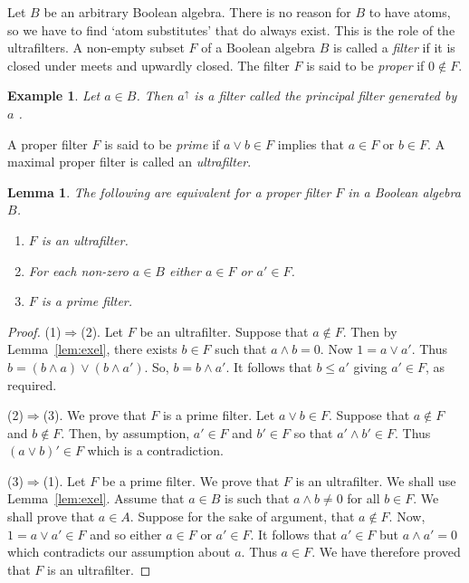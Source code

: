 \documentclass[a4paper]{amsart}
\newtheorem{lemma}[theorem]{Lemma}
\newtheorem{example}[theorem]{Example}
\begin{document}
Let $B$ be an arbitrary Boolean algebra.
There is no reason for $B$ to have atoms, so we have to find `atom substitutes' that do always exist.
This is the role of the ultrafilters.
A non-empty subset $F$ of a Boolean algebra $B$ is called a {\em filter} if it is closed under meets and upwardly closed.
The filter $F$ is said to be {\em proper} if $0 \notin F$.

\begin{example}\label{ex:needed}
{\em Let $a \in B$.
Then $a^{\uparrow}$ is a filter called the {\em principal filter generated by $a$}
}.
\end{example}




A proper filter $F$ is said to be {\em prime} if $a \vee b \in F$ implies that $a \in F$ or $b \in F$. 
A maximal proper filter is called an {\em ultrafilter}.

\begin{lemma}\label{lem:france-two} The following are equivalent for a proper filter $F$ in a Boolean algebra $B$.
\begin{enumerate}

\item $F$ is an ultrafilter.

\item For each non-zero $a \in B$ either $a \in F$ or $a' \in F$.

\item $F$ is a prime filter.

\end{enumerate}
\end{lemma}
\begin{proof} (1)$\Rightarrow$(2).
Let $F$ be an ultrafilter.
Suppose that $a \notin F$.
Then by Lemma~\ref{lem:exel}, there exists $b \in F$ such that $a \wedge b = 0$.
Now $1 = a \vee a'$.
Thus $b = (b \wedge a) \vee (b \wedge a')$.
So, $b = b \wedge a'$.
It follows that $b \leq a'$ giving $a' \in F$, as required.

(2)$\Rightarrow$(3).
We prove that $F$ is a prime filter.
Let $a \vee b \in F$.
Suppose that $a \notin F$ and $b \notin F$.
Then, by assumption, $a' \in F$ and $b' \in F$ so that $a' \wedge b' \in F$.
Thus $(a \vee b)' \in F$ which is a contradiction.

(3)$\Rightarrow$(1). Let $F$ be a prime filter.
We prove that $F$ is an ultrafilter.
We shall use Lemma~\ref{lem:exel}.
Assume that $a \in B$ is such that $a \wedge b \neq 0$ for all $b \in F$.
We shall prove that $a \in A$.
Suppose for the sake of argument, that $a \notin F$.
Now, $1 = a \vee a' \in F$ and so either $a \in F$ or $a' \in F$.
It follows that $a' \in F$ but $a \wedge a' = 0$
which contradicts our assumption about $a$.
Thus $a \in F$.
We have therefore proved that $F$ is an ultrafilter.
\end{proof}
\end{document}
